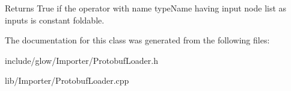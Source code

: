 \begin{DoxyReturn}{Returns}
True if the operator with name {\ttfamily type\+Name} having input node list as {\ttfamily inputs} is constant foldable. 
\end{DoxyReturn}


The documentation for this class was generated from the following files\+:\begin{DoxyCompactItemize}
\item 
include/glow/\+Importer/Protobuf\+Loader.\+h\item 
lib/\+Importer/Protobuf\+Loader.\+cpp\end{DoxyCompactItemize}
